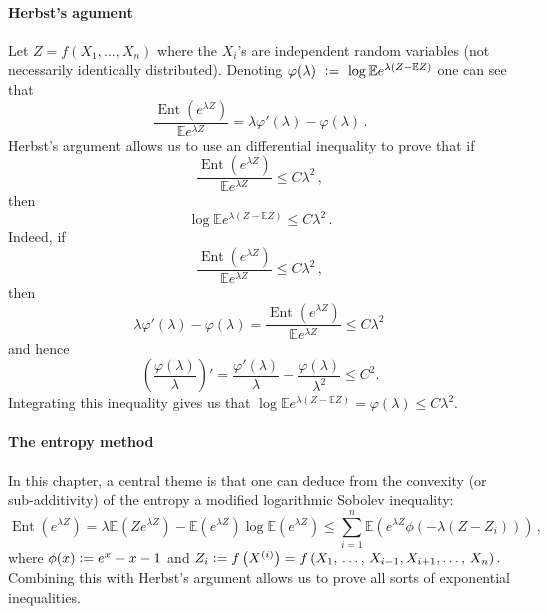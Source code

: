 \documentclass[reqno]{amsproc}
\newcommand{\defeq}{\vcentcolon=} %
\newcommand{\E}{\mathbb{E}} %
\DeclareMathOperator{\Ent}{Ent} %
\begin{document}
\paragraph{\textbf{Herbst's agument}}
\label{rmk:herbst_2}
	Let $Z = f(X_1,\dots,X_n)$ where the $X_i$'s are independent random variables (not necessarily identically distributed).
	Denoting $\varphi(\lambda)~\defeq~\log \E e^{\lambda(Z - \E Z)}$ one can see that 
	\begin{equation*}
		\frac{ \Ent (e^{\lambda Z})}{ \E e^{\lambda Z}} = \lambda \varphi'(\lambda) -
		\varphi(\lambda) \,.
	\end{equation*}
	Herbst's argument allows us to use an differential inequality to prove that
	if 
	\begin{equation*}
		\frac{ \Ent (e^{\lambda Z})}{ \E e^{\lambda Z}} \leq C\lambda^2 \,,
	\end{equation*}
	then 
	\begin{equation*}
		\log \E e^{\lambda(Z- \E Z)} \leq C\lambda^2 \,.
	\end{equation*}
	Indeed, if
	\begin{equation*}
		\frac{ \Ent (e^{\lambda Z})}{ \E e^{\lambda Z}} \leq C\lambda^2 \,,
	\end{equation*}
	then
	\begin{equation*}
		\lambda \varphi' \left( \lambda \right) - \varphi \left( \lambda \right) = 
		\frac{ \Ent (e^{\lambda Z})}{ \E e^{\lambda Z}} \leq C\lambda^2 \,
	\end{equation*}
	and hence
	\begin{equation*}
		\left( \frac{\varphi \left( \lambda \right)}{\lambda} \right)' = \frac{\varphi' \left( \lambda \right)}{\lambda} - \frac{ \varphi \left( \lambda \right)}{\lambda^2} \leq C^2 .
	\end{equation*}
	Integrating this inequality gives us that $\log \E e^{\lambda(Z - \E Z)} = \varphi \left( \lambda \right) \leq C\lambda^2$.

\paragraph{\textbf{The entropy method}}
\label{rmk:entropy_method}
	In this chapter, a central theme is that one can deduce from the convexity (or sub-additivity) of the entropy a modified logarithmic Sobolev inequality:
	\begin{equation*}
		\Ent \left( e^{\lambda Z} \right) = \lambda \E ( Ze^{\lambda Z}) - \E( e^{\lambda Z})\log \E(e^{\lambda Z}) \leq
		\sum_{i=1}^n \E (e^{\lambda Z} \phi( - \lambda (Z-Z_i))) \,,
	\end{equation*}
	where $\phi (x) \defeq e^x - x - 1$ and $Z_i \defeq f \left( X^{(i)} \right) = f \left( X_1,\,\dots,\,X_{i-1},X_{i+1},\dots,\,X_n \right).$
	Combining this with Herbst's argument allows us to prove all sorts of exponential inequalities.
\end{document}
